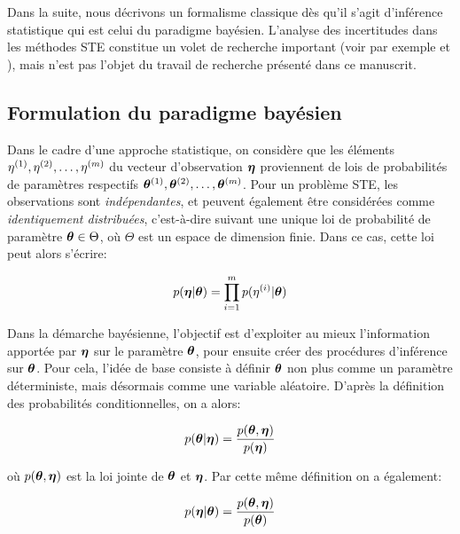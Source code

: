 Dans la suite, nous décrivons un formalisme classique dès qu'il s'agit d'inférence statistique qui est celui du paradigme bayésien. L'analyse des incertitudes dans les méthodes STE constitue un volet de recherche important (voir par exemple \cite{Rodriguez2011} et \cite{Rodriguez2013}), mais n'est pas l'objet du travail de recherche présenté dans ce manuscrit.\\

\subsection{Formulation du paradigme bayésien}
\label{paragraphe_paradigme_bayesien}

Dans le cadre d'une approche statistique, on considère que les éléments ${\eta}^{(1)}, {\eta}^{(2)}, \dots, {\eta}^{(m)}$ du vecteur d'observation ${\bm{\eta}}$ proviennent de lois de probabilités de paramètres respectifs ${\bm{\theta}}^{(1)}, {\bm{\theta}}^{(2)}, \dots, {\bm{\theta}}^{(m)}$. Pour un problème STE, les observations sont \textit{indépendantes}, et peuvent également être considérées comme \textit{identiquement distribuées}, c'est-à-dire suivant une unique loi de probabilité de paramètre ${\bm{\theta}} \in \Theta$, où $\Theta$ est un espace de dimension finie. Dans ce cas, cette loi peut alors s'écrire:

\begin{equation}
	p({\bm{\eta}} | {\bm{\theta}}) = \prod_{i=1}^m p({\eta}^{(i)} | {\bm{\theta}})
	\label{eq_bayesien_modele_observation}
\end{equation}

Dans la démarche bayésienne, l'objectif est d'exploiter au mieux l'information apportée par ${\bm{\eta}}$ sur le paramètre ${\bm{\theta}}$, pour ensuite créer des procédures d'inférence sur ${\bm{\theta}}$. Pour cela, l'idée de base consiste à définir ${\bm{\theta}}$ non plus comme un paramètre déterministe, mais désormais comme une variable aléatoire. D'après la définition des probabilités conditionnelles, on a alors:

\begin{equation}
	p({\bm{\theta}} | {\bm{\eta}}) = \dfrac{p({\bm{\theta}}, {\bm{\eta}})}{p({\bm{\eta}})}
	\label{equation_pre_bayes_1}
\end{equation}

où $p({\bm{\theta}}, {\bm{\eta}})$ est la loi jointe de ${\bm{\theta}}$ et ${\bm{\eta}}$. Par cette même définition on a également:

\begin{equation}
	p({\bm{\eta}} | {\bm{\theta}}) =  \dfrac{p({\bm{\theta}}, {\bm{\eta}})}{p({\bm{\theta}})}
	\label{equation_pre_bayes_2}
\end{equation}

